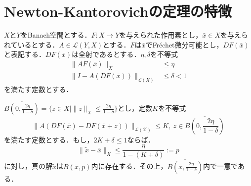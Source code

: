 \section{Newton-Kantorovichの定理の特徴\cite{r1}}
\begin{thm}
  \label{thm:Newton-Kantorovichの定理の亜種}
  $X$と$Y$をBanach空間とする．$F:X\rightarrow Y$を与えられた作用素とし，$\bar{x}\in X$を与えられているとする．$A\in \mathcal{L}(Y,X)$とする．$F$は$\bar{x}$でFr\'{e}chet微分可能とし，$DF(\bar{x})$と表記する．$DF(\bar{x})$は全射であるとする．$\eta,\delta$を不等式
  \begin{align*}
    \|AF(\bar{x})\|_X &\leq \eta \\
    \|I-A(DF(\bar{x}))\|_{\mathcal{L}(X)} &\leq \delta < 1
  \end{align*}
  を満たす定数とする．

  $\overline{B(0,\frac{2\eta}{1-\delta})} = \{z\in X \mid \|z\|_X \leq \frac{2\eta}{1-\delta} \}$とし，定数$K$を不等式
  \begin{equation*}
    \|A(DF(\bar{x})-DF(\bar{x}+z))\|_\mathcal{{L}(X)} \leq K,\ z\in \overline{B\left(0,\frac{2\eta}{1-\delta}\right)}
  \end{equation*}
  を満たす定数とする．もし，$2K+\delta\leq 1$ならば．
  \begin{equation*}
    \|\tilde{x}-\bar{x}\|_X \leq \frac{\eta}{1-(K+\delta)} := p
  \end{equation*}
  に対し，真の解$\tilde{x}$は$\bar{B}(\bar{x},p)$内に存在する．その上，$\overline{B\left(\bar{x},\frac{2\eta}{1-\delta}\right)}$内で一意である．
\end{thm}

